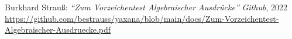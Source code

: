 %
%
\vfill
\begin{thebibliography}{----}

Burkhard Strauß:
\textit{“Zum Vorzeichentest Algebraischer Ausdrücke”}
\textit{Github},
2022 \url{https://github.com/bestrauss/yaxana/blob/main/docs/Zum-Vorzeichentest-Algebraischer-Ausdruecke.pdf}

\end{thebibliography}
%
%

